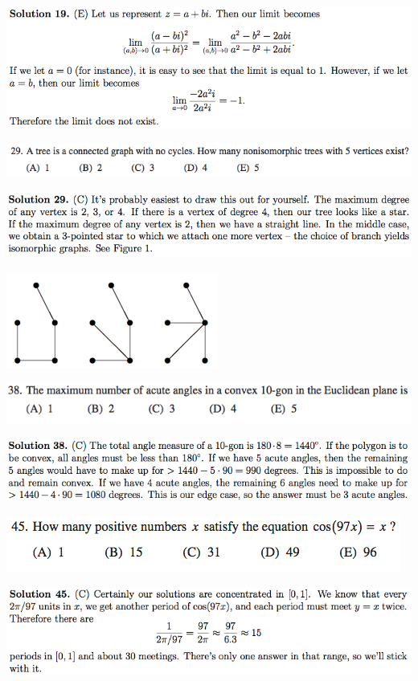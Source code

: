 \documentclass{article}
\begin{document}
\includegraphics[scale=0.65]{1268_19s}

\includegraphics[scale=0.65]{1268_28}

\includegraphics[scale=0.65]{1268_28s}

\begin{center}
\includegraphics[scale=0.65]{1268_28fig}
\end{center}

\includegraphics[scale=0.65]{1268_38}

\includegraphics[scale=0.65]{1268_38s}

\includegraphics[scale=0.65]{1268_45}

\includegraphics[scale=0.65]{1268_45s}
\end{document}

